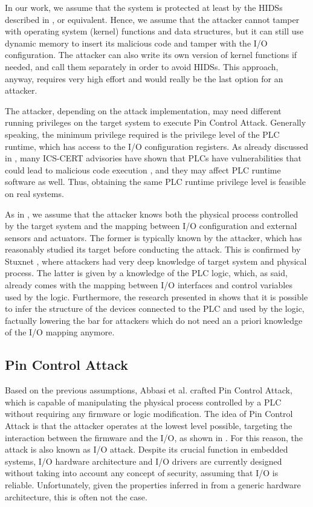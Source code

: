 In our work, we assume that the system is protected at least by the HIDSs described in , or equivalent.
Hence, we assume that the attacker cannot tamper with operating system (kernel) functions and data structures, but it can still use dynamic memory to insert its malicious code
and tamper with the I/O configuration. The attacker can also write its own version of kernel functions if needed, and call them separately in order to avoid HIDSs.
This approach, anyway, requires very high effort and would really be the last option for an attacker.

The attacker, depending on the attack implementation, may need different running privileges on the target system to execute Pin Control Attack.
Generally speaking, the minimum privilege required is the privilege level of the PLC runtime, which has access to the I/O configuration registers.
As already discussed in \cite{ghostplc}, many ICS-CERT advisories have shown that PLCs have vulnerabilities that could lead to malicious code execution
\cite{plc-network,abb-codesys,codesys-server,schneider-bof,rockwell-vuln,rockwell-vuln2}, and they may affect PLC runtime software as well.
Thus, obtaining the same PLC runtime privilege level is feasible on real systems.

As in \cite{ghostplc}, we assume that the attacker knows both the physical process controlled by the target system and the mapping
between I/O configuration and external sensors and actuators. The former is typically known by the attacker, which has reasonably studied its target before conducting the attack.
This is confirmed by Stuxnet \cite{stuxnet}, where attackers had very deep knowledge of target system and physical process.
The latter is given by a knowledge of the PLC logic, which, as said, already comes with the mapping between I/O interfaces and control variables used by the logic.
Furthermore, the research presented in \cite{dynamic-payload,sabot} shows that it is possible to infer the structure of the devices connected to the PLC and used by the logic,
factually lowering the bar for attackers which do not need an a priori knowledge of the I/O mapping anymore.


\subsection{Pin Control Attack}

Based on the previous assumptions, Abbasi et al. \cite{ghostplc} crafted Pin Control Attack, which is capable of manipulating the physical process
controlled by a PLC without requiring any firmware or logic modification.
The idea of Pin Control Attack is that the attacker operates at the lowest level possible, targeting the interaction
between the firmware and the I/O, as shown in . For this reason, the attack is also known as I/O attack.
Despite its crucial function in embedded systems, I/O hardware architecture and I/O drivers are currently designed
without taking into account any concept of security, assuming that I/O is reliable. Unfortunately, given the properties inferred in 
from a generic hardware architecture, this is often not the case.

